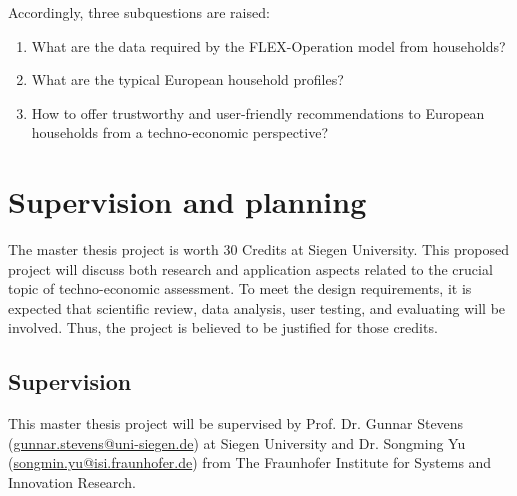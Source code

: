 

Accordingly, three subquestions are raised: 

\begin{enumerate}
  \item What are the data required by the FLEX-Operation model from households? 
  \item What are the typical European household profiles? 
  \item How to offer trustworthy and user-friendly recommendations to European households from a techno-economic perspective? 
\end{enumerate}




\section{Supervision and planning} 




The master thesis project is worth 30 Credits at Siegen University. 
This proposed project will discuss both research and application aspects 
related to the crucial topic of techno-economic assessment. 
To meet the design requirements, 
it is expected that scientific review, data analysis, user testing, and evaluating will be involved. 
Thus, the project is believed to be justified for those credits.


\subsection{Supervision}


This master thesis project will be supervised by 
Prof. Dr. Gunnar Stevens (\href{mailto:gunnar.stevens@uni-siegen.de}{gunnar.stevens@uni-siegen.de}) at Siegen University and 
Dr. Songming Yu (\href{mailto:songmin.yu@isi.fraunhofer.de}{songmin.yu@isi.fraunhofer.de}) from The Fraunhofer Institute for Systems and Innovation Research. 


